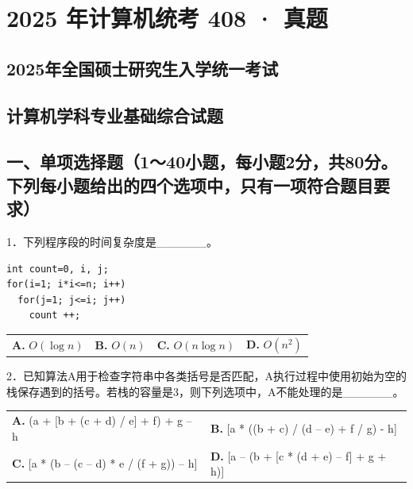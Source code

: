 \documentclass[UTF8,11pt]{ctexart}
\begin{document}
\section*{2025 年计算机统考 408 · 真题}
\subsection*{2025年全国硕士研究生入学统一考试}

\subsection*{计算机学科专业基础综合试题}

\subsection*{一、单项选择题（1～40小题，每小题2分，共80分。下列每小题给出的四个选项中，只有一项符合题目要求）}

1．下列程序段的时间复杂度是\_\_\_\_\_\_。


\begin{Verbatim}[breaklines,breakanywhere,fontsize=\small]
int count=0, i, j;
for(i=1; i*i<=n; i++)
  for(j=1; j<=i; j++)
    count ++;
\end{Verbatim}

\begin{center}\begin{tabular}{>{\raggedright\arraybackslash}p{\dimexpr(\linewidth-8\tabcolsep)/4\relax}>{\raggedright\arraybackslash}p{\dimexpr(\linewidth-8\tabcolsep)/4\relax}>{\raggedright\arraybackslash}p{\dimexpr(\linewidth-8\tabcolsep)/4\relax}>{\raggedright\arraybackslash}p{\dimexpr(\linewidth-8\tabcolsep)/4\relax}}
\textbf{A.} \(\displaystyle O(\log n)\) & \textbf{B.} \(\displaystyle O(n)\) & \textbf{C.} \(\displaystyle O(n\log n)\) & \textbf{D.} \(\displaystyle O(n^2)\)\\[.35em]\end{tabular}\end{center}

2．已知算法A用于检查字符串中各类括号是否匹配，A执行过程中使用初始为空的栈保存遇到的括号。若栈的容量是3，则下列选项中，A不能处理的是\_\_\_\_\_\_。


\begin{center}\begin{tabular}{>{\raggedright\arraybackslash}p{\dimexpr(\linewidth-4\tabcolsep)/2\relax}>{\raggedright\arraybackslash}p{\dimexpr(\linewidth-4\tabcolsep)/2\relax}}
\textbf{A.} (a + [b + (c + d) / e] + f) + g – h & \textbf{B.} [a * ((b + c) / (d – e) + f / g) - h]\\[.35em]
\textbf{C.} [a * (b – (c – d) * e / (f + g)) – h] & \textbf{D.} [a – (b + [c * (d + e) – f] + g + h)]\\[.35em]\end{tabular}\end{center}
\end{document}
